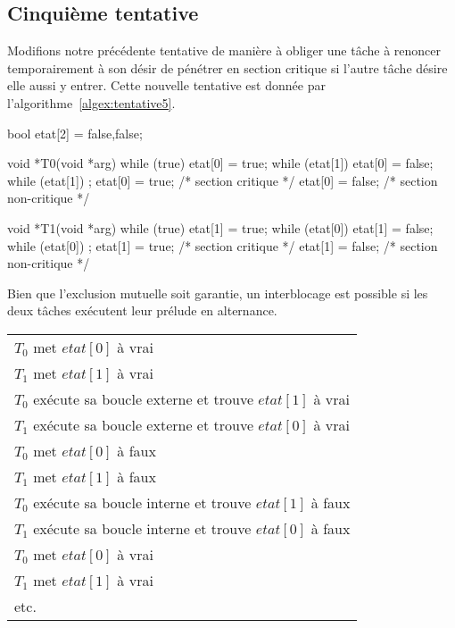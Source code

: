 \subsection*{Cinquième tentative}
Modifions notre précédente tentative de manière à obliger une tâche à renoncer temporairement à son désir de pénétrer en section critique si l'autre tâche désire elle aussi y entrer.
Cette nouvelle tentative est donnée par l'algorithme~\ref{algex:tentative5}.

\begin{codeblock}[label=algex:tentative5, title={Cinquième tentative d'exclusion mutuelle}]
bool etat[2] = {false,false};

void *T0(void *arg)
{
  while (true) {
    etat[0] = true;
    while (etat[1]) {
      etat[0] = false;
      while (etat[1])
        ;
      etat[0] = true;
    }
    /* section critique */
    etat[0] = false;
    /* section non-critique */
  }
}

void *T1(void *arg)
{
  while (true) {
    etat[1] = true;
    while (etat[0]) {
      etat[1] = false;
      while (etat[0])
        ;
      etat[1] = true;
    }
    /* section critique */
    etat[1] = false;
    /* section non-critique */
  }
}
\end{codeblock}

Bien que l'exclusion mutuelle soit garantie, un interblocage est possible si les deux tâches exécutent leur prélude en alternance.
\par\noindent
\begin{center}
\begin{tabular}{l}
  $T_0$ met $etat[0]$ à vrai                                 \\
  $T_1$ met $etat[1]$ à vrai                                 \\
  $T_0$ exécute sa boucle externe et trouve $etat[1]$ à vrai \\
  $T_1$ exécute sa boucle externe et trouve $etat[0]$ à vrai \\
  $T_0$ met $etat[0]$ à faux                                 \\
  $T_1$ met $etat[1]$ à faux                                 \\
  $T_0$ exécute sa boucle interne et trouve $etat[1]$ à faux \\
  $T_1$ exécute sa boucle interne et trouve $etat[0]$ à faux \\
  $T_0$ met $etat[0]$ à vrai                                 \\
  $T_1$ met $etat[1]$ à vrai                                 \\
  etc.                                                       \\
\end{tabular}
\end{center}

